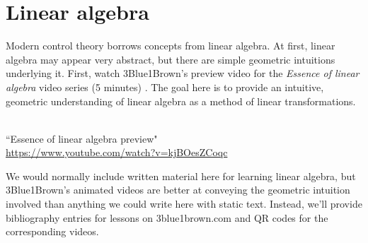 
\chapter{Linear algebra}

Modern control theory borrows concepts from linear algebra. At first, linear
algebra may appear very abstract, but there are simple geometric intuitions
underlying it. First, watch 3Blue1Brown's preview video for the
\textit{Essence of linear algebra} video series (5 minutes)
\cite{bib:3b1b_linalg_preview}. The goal here is to provide an intuitive,
geometric understanding of linear algebra as a method of linear transformations.
\begin{bookfigure}
   \\
  \tiny
  ``Essence of linear algebra preview" \\
  \url{https://www.youtube.com/watch?v=kjBOesZCoqc}
\end{bookfigure}

We would normally include written material here for learning linear algebra, but
3Blue1Brown's animated videos are better at conveying the geometric intuition
involved than anything we could write here with static text. Instead, we'll
provide bibliography entries for lessons on 3blue1brown.com and QR codes for the
corresponding videos.

\renewcommand*{\chapterpath}{\partpath/linear-algebra}












